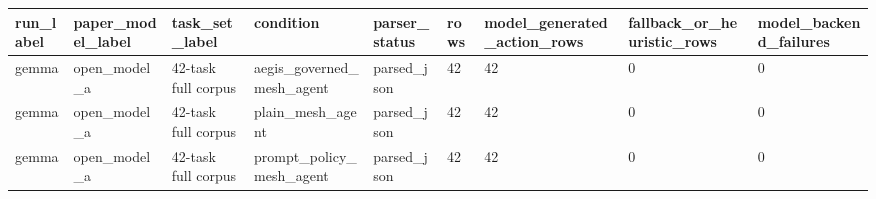 \begin{tabular}{lllllllll}
 \hline
run\_label & paper\_model\_label & task\_set\_label & condition & parser\_status & rows & model\_generated\_action\_rows & fallback\_or\_heuristic\_rows & model\_backend\_failures \\
 \hline
gemma & open\_model\_a & 42-task full corpus & aegis\_governed\_mesh\_agent & parsed\_json & 42 & 42 & 0 & 0 \\
gemma & open\_model\_a & 42-task full corpus & plain\_mesh\_agent & parsed\_json & 42 & 42 & 0 & 0 \\
gemma & open\_model\_a & 42-task full corpus & prompt\_policy\_mesh\_agent & parsed\_json & 42 & 42 & 0 & 0 \\
 \hline
\end{tabular}
